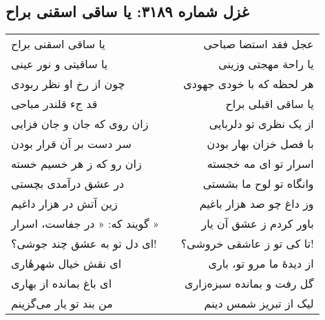 \begin{center}
\section*{غزل شماره ۳۱۸۹: یا ساقی اسقنی براح}
\label{sec:3189}
\begin{longtable}{l p{0.5cm} r}
یا ساقی اسقنی براح
&&
عجل فقد استضا صباحی
\\
یا ساقیتی و نور عینی
&&
یا راحة مهجتی وزینی
\\
چون از رخ او نظر ربودی
&&
هر لحظه که با خودی جهودی
\\
قد جء قلندر مباحی
&&
یا ساقی اقبلی براح
\\
زان روی که جان و جان فزایی
&&
از یک نظری تو دلربایی
\\
سر دست بر آن قرار بودن
&&
با فصل خزان بهار بودن
\\
زان رو که ز هر خسیم خسته
&&
اسرار تو ای مه خجسته
\\
در عشق درآمدی بچستی
&&
وانگاه تو لوح ما بشستی
\\
زین آتش در هزار داغیم
&&
وز داغ چو صد هزار باغیم
\\
گویند که: « در جفاست، اسرار »
&&
باور کردم ز عشق آن یار
\\
ای دل تو به عشق چند جوشی؟!
&&
تا کی تو ز عاشقی خروشی؟!
\\
ای نقش خیال شهرهٔاری
&&
از دیدهٔ ما مرو تو، باری
\\
ای باغ بمانده از بهاری
&&
گل رفت و بمانده سبزه‌زاری
\\
من بند تو یار می‌گزینم
&&
لیک از تبریز شمس دینم
\\
\end{longtable}
\end{center}
